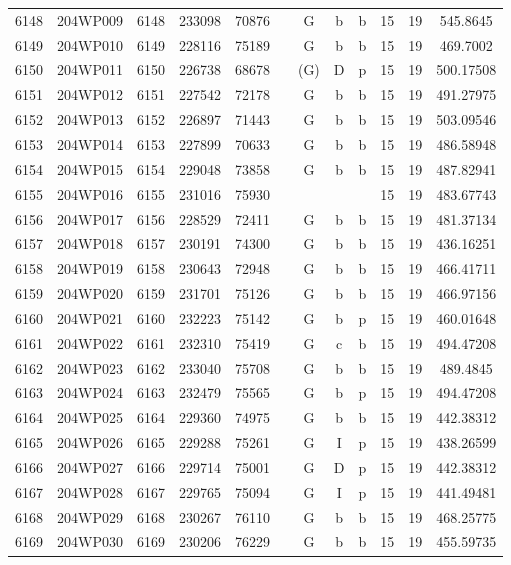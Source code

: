 \begin{tabular}{|*{12}{c|}}
6148 & 204WP009 & 6148 & 233098 & 70876 &  & G & b & b & 15 & 19 & 545.8645 \\ 
6149 & 204WP010 & 6149 & 228116 & 75189 &  & G & b & b & 15 & 19 & 469.7002 \\ 
6150 & 204WP011 & 6150 & 226738 & 68678 &  & (G) & D & p & 15 & 19 & 500.17508 \\ 
6151 & 204WP012 & 6151 & 227542 & 72178 &  & G & b & b & 15 & 19 & 491.27975 \\ 
6152 & 204WP013 & 6152 & 226897 & 71443 &  & G & b & b & 15 & 19 & 503.09546 \\ 
6153 & 204WP014 & 6153 & 227899 & 70633 &  & G & b & b & 15 & 19 & 486.58948 \\ 
6154 & 204WP015 & 6154 & 229048 & 73858 &  & G & b & b & 15 & 19 & 487.82941 \\ 
6155 & 204WP016 & 6155 & 231016 & 75930 &  &  &  &  & 15 & 19 & 483.67743 \\ 
6156 & 204WP017 & 6156 & 228529 & 72411 &  & G & b & b & 15 & 19 & 481.37134 \\ 
6157 & 204WP018 & 6157 & 230191 & 74300 &  & G & b & b & 15 & 19 & 436.16251 \\ 
6158 & 204WP019 & 6158 & 230643 & 72948 &  & G & b & b & 15 & 19 & 466.41711 \\ 
6159 & 204WP020 & 6159 & 231701 & 75126 &  & G & b & b & 15 & 19 & 466.97156 \\ 
6160 & 204WP021 & 6160 & 232223 & 75142 &  & G & b & p & 15 & 19 & 460.01648 \\ 
6161 & 204WP022 & 6161 & 232310 & 75419 &  & G & c & b & 15 & 19 & 494.47208 \\ 
6162 & 204WP023 & 6162 & 233040 & 75708 &  & G & b & b & 15 & 19 & 489.4845 \\ 
6163 & 204WP024 & 6163 & 232479 & 75565 &  & G & b & p & 15 & 19 & 494.47208 \\ 
6164 & 204WP025 & 6164 & 229360 & 74975 &  & G & b & b & 15 & 19 & 442.38312 \\ 
6165 & 204WP026 & 6165 & 229288 & 75261 &  & G & I & p & 15 & 19 & 438.26599 \\ 
6166 & 204WP027 & 6166 & 229714 & 75001 &  & G & D & p & 15 & 19 & 442.38312 \\ 
6167 & 204WP028 & 6167 & 229765 & 75094 &  & G & I & p & 15 & 19 & 441.49481 \\ 
6168 & 204WP029 & 6168 & 230267 & 76110 &  & G & b & b & 15 & 19 & 468.25775 \\ 
6169 & 204WP030 & 6169 & 230206 & 76229 &  & G & b & b & 15 & 19 & 455.59735 \\ 

\end{tabular}
